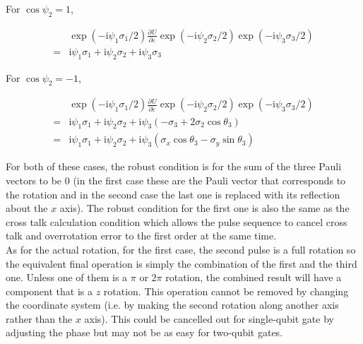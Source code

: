 \documentclass[10pt,fleqn]{article}
\newcommand{\ui}{\mathrm{i}}
\newcommand{\eqar}[1]
{
  \begin{align*}
    #1
  \end{align*}
}
\newcommand{\paren}[1]{{\left({#1}\right)}}
\newcommand{\pdiff}[3][{}]{{\frac{\partial^{#1} {#2}}{\partial {#3}{}^{#1}}}}
\begin{document}
For $\cos\psi_2=1$,
\eqar{
  &\exp\paren{-\ui\psi_1\sigma_1/2}\pdiff{U}{\varepsilon}\exp\paren{-\ui\psi_2\sigma_2/2}\exp\paren{-\ui\psi_3\sigma_3/2}\\
  =&\ui\psi_1\sigma_1+\ui\psi_2\sigma_2+\ui\psi_3\sigma_3
}

For $\cos\psi_2=-1$,
\eqar{
  &\exp\paren{-\ui\psi_1\sigma_1/2}\pdiff{U}{\varepsilon}\exp\paren{-\ui\psi_2\sigma_2/2}\exp\paren{-\ui\psi_3\sigma_3/2}\\
  =&\ui\psi_1\sigma_1+\ui\psi_2\sigma_2+
  \ui\psi_3\paren{-\sigma_3+2\sigma_2\cos\theta_3}\\
  =&\ui\psi_1\sigma_1+\ui\psi_2\sigma_2+
  \ui\psi_3\paren{\sigma_x\cos\theta_3-\sigma_y\sin\theta_3}
}

For both of these cases, the robust condition is for the sum of
the three Pauli vectors to be $0$
(in the first case these are the Pauli vector that corresponds to the rotation
and in the second case the last one is replaced
with its reflection about the $x$ axis).
The robust condition for the first one
is also the same as the cross talk calculation condition which allows
the pulse sequence to cancel cross talk and overrotation error to the first order
at the same time.\\

As for the actual rotation, for the first case, the second pulse is a full rotation
so the equivalent final operation is simply the combination
of the first and the third one. Unless one of them is a $\pi$ or $2\pi$ rotation,
the combined result will have a component that is a $z$ rotation.
This operation cannot be removed by changing the coordinate system
(i.e. by making the second rotation along another axis rather than the $x$ axis).
This could be cancelled out for single-qubit gate by adjusting the phase
but may not be as easy for two-qubit gates.\\
\end{document}
